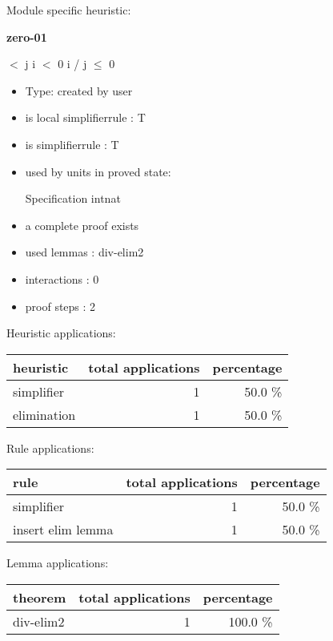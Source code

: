 \documentclass[a4paper]{article}
\begin{document}
Module specific heuristic:

\pagebreak

{\LARGE\bf zero-01}\label{lemma-zero-01}

\medskip

  $<$ j \And i $<$ 0 \Imp i / j $\le$ 0

\begin{itemize}

\item Type: created by user

\item is local simplifierrule : T
\item is simplifierrule : T
\item used by units in proved state:

Specification intnat
\item       a complete proof exists
\item       used lemmas  : div-elim2
\item       interactions : 0
\item       proof steps  : 2
\end{itemize}

\medskip


Heuristic applications:

\begin{supertabular}{l|r|r}
heuristic	& total applications & percentage \\ \hline
simplifier & 1 & 50.0 \% \\
elimination & 1 & 50.0 \% \\

\end{supertabular}

Rule applications:

\begin{supertabular}{l|r|r}
rule	        & total applications & percentage \\ \hline
simplifier & 1 & 50.0 \% \\
insert elim lemma & 1 & 50.0 \% \\

\end{supertabular}

Lemma applications:

\begin{supertabular}{l|r|r}
theorem	        & total applications & percentage \\ \hline
div-elim2 & 1 & 100.0 \% \\

\end{supertabular}
\end{document}
